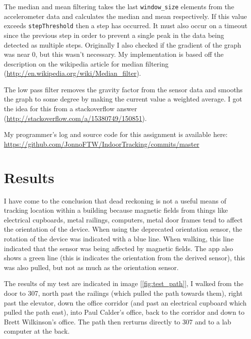 \documentclass[11pt]{article}
\begin{document}
The median and mean filtering takes the last \verb+window_size+ elements from the accelerometer data and calculates the median and mean respectively. If this value exceeds  \verb+stepThreshold+ then a step has occurred. It must also occur on a timeout since the previous step in order to prevent a single peak in the data being detected as multiple steps. Originally I also checked if the gradient of the graph was near 0, but this wasn't necessary. My implementation is based off the description on the wikipedia article for median filtering (\url{http://en.wikipedia.org/wiki/Median_filter}).

The low pass filter removes the gravity factor from the sensor data and smooths the graph to some degree by making the current value a weighted average. I got the idea for this from a stackoverflow answer (\url{http://stackoverflow.com/a/15380749/150851}).

My programmer's log and source code for this assignment is available here: \url{https://github.com/JonnoFTW/IndoorTracking/commits/master}

\section{Results}

I have come to the conclusion that dead reckoning is not a useful means of tracking location within a building because magnetic fields from things like electrical cupboards, metal railings, computers, metal door frames tend to affect the orientation of the device. When using the deprecated orientation sensor, the rotation of the device was indicated with a blue line. When walking, this line indicated that the sensor was being affected by magnetic fields. The app also shows a green line (this is indicates the orientation from the derived sensor), this was also pulled, but not as much as the orientation sensor.

The results of my test are indicated in image [\ref{fig:test_path}], I walked from the door to 307, north past the railings (which pulled the path towards them), right past the elevator, down the office corridor (and past an electrical cupboard which pulled the path east), into Paul Calder's office, back to the corridor and down to Brett Wilkinson's office. The path then rerturns directly to 307 and to a lab computer at the back.
\end{document}
